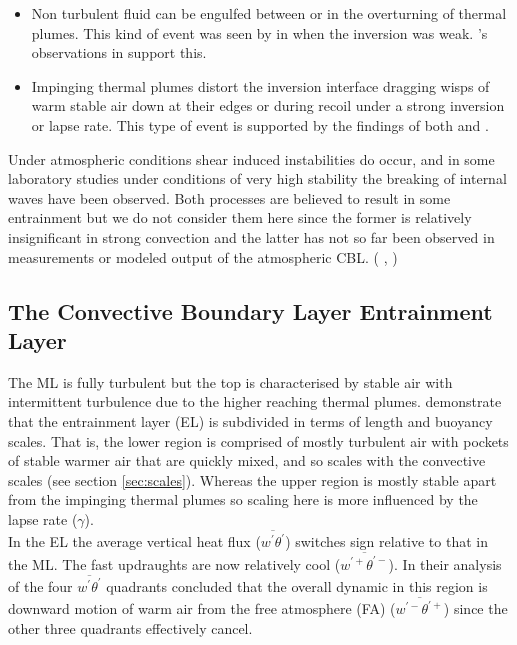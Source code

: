 \begin{itemize}

\item{Non turbulent fluid can be engulfed between or in the overturning of thermal plumes. This kind of
event was seen by \citeauthor{SullMoengStev} in \cite{SullMoengStev} when the inversion was weak. 
\citeauthor{Traum11}'s observations in \cite{Traum11} support this.
}
\item{
Impinging thermal plumes distort the inversion interface dragging wisps of warm stable air down
at their edges or during recoil under a strong inversion or lapse rate. This type of event is supported 
by the findings  of both \citeauthor{SullMoengStev} \cite{SullMoengStev} and \citeauthor{Traum11} \cite{Traum11}.}

\end{itemize}

Under atmospheric conditions shear induced instabilities do occur, and in some laboratory studies 
under conditions of very high stability the breaking of internal waves have been observed.  
Both processes are believed to result in some entrainment but we do not consider them here
since the former is relatively insignificant in strong convection and the latter has not so far been observed 
in measurements or modeled output of the atmospheric \acs{CBL}. 
(\citeauthor{Traum11} \cite{Traum11}, \citeauthor{SullMoengStev} \cite{SullMoengStev})

\subsection{The Convective Boundary Layer Entrainment Layer}
\label{subsec:}

The \acs{ML} is fully turbulent but the top is characterised by stable air with intermittent turbulence due
to the higher reaching thermal plumes. \citeauthor{GarciaMellado} demonstrate that the entrainment layer (\acs{EL})
 is subdivided in terms of length and buoyancy scales.  That is, the lower region is comprised of mostly
turbulent air with pockets of stable warmer air that are quickly mixed, and so scales with the convective scales
(see section \ref{sec:scales}). Whereas the upper region is mostly stable apart from the impinging thermal plumes 
so scaling here is more influenced by the lapse rate ($\gamma$).\\  

In the \acs{EL} the average vertical heat flux ($\overline{w^{'}\theta^{'}}$) switches sign relative to that in the \acs{ML}.
The fast updraughts are now relatively cool ($\overline{w^{'+}\theta^{'-}}$).  In their analysis of the four $\overline{w^{'}\theta^{'}}$
quadrants \citeauthor{SullMoengStev} \cite{SullMoengStev} concluded that the overall dynamic in this region is downward motion of 
warm air from the free atmosphere (\acs{FA}) ($\overline{w^{'-}\theta^{'+}}$) since the other three quadrants effectively cancel.\\

